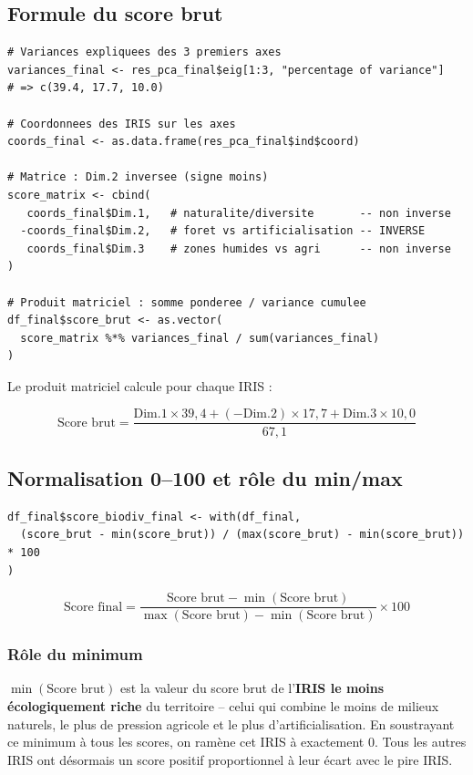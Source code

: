 \documentclass[11pt,a4paper]{report}
\begin{document}
\subsection{Formule du score brut}

\begin{lstlisting}
# Variances expliquees des 3 premiers axes
variances_final <- res_pca_final$eig[1:3, "percentage of variance"]
# => c(39.4, 17.7, 10.0)

# Coordonnees des IRIS sur les axes
coords_final <- as.data.frame(res_pca_final$ind$coord)

# Matrice : Dim.2 inversee (signe moins)
score_matrix <- cbind(
   coords_final$Dim.1,   # naturalite/diversite       -- non inverse
  -coords_final$Dim.2,   # foret vs artificialisation -- INVERSE
   coords_final$Dim.3    # zones humides vs agri      -- non inverse
)

# Produit matriciel : somme ponderee / variance cumulee
df_final$score_brut <- as.vector(
  score_matrix %*% variances_final / sum(variances_final)
)
\end{lstlisting}

Le produit matriciel calcule pour chaque IRIS :

\begin{equation}
  \text{Score brut} = \frac{\text{Dim.1} \times 39{,}4 + (-\text{Dim.2}) \times 17{,}7 + \text{Dim.3} \times 10{,}0}{67{,}1}
\end{equation}

\subsection{Normalisation 0--100 et rôle du min/max}

\begin{lstlisting}
df_final$score_biodiv_final <- with(df_final,
  (score_brut - min(score_brut)) / (max(score_brut) - min(score_brut)) * 100
)
\end{lstlisting}

\begin{equation}
  \text{Score final} = \frac{\text{Score brut} - \min(\text{Score brut})}{\max(\text{Score brut}) - \min(\text{Score brut})} \times 100
\end{equation}

\subsubsection*{Rôle du minimum}

$\min(\text{Score brut})$ est la valeur du score brut de l'\textbf{IRIS le moins écologiquement riche} du territoire -- celui qui combine le moins de milieux naturels, le plus de pression agricole et le plus d'artificialisation. En soustrayant ce minimum à tous les scores, on ramène cet IRIS à exactement 0. Tous les autres IRIS ont désormais un score positif proportionnel à leur écart avec le pire IRIS.
\end{document}
